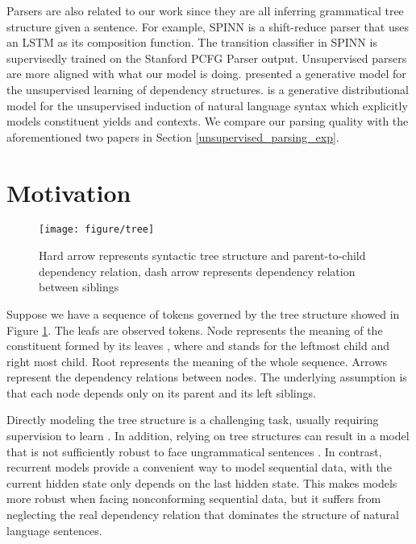 \documentclass{article} \usepackage{iclr2018_conference,times}
\begin{document}
Parsers are also related to our work since they are all inferring grammatical tree structure given a sentence. For example, SPINN \citep{bowman2016fast} is a shift-reduce parser that uses an LSTM as its composition function. The transition classifier in SPINN is supervisedly trained on the Stanford PCFG Parser \citep{Klein:2003:AUP:1075096.1075150} output. Unsupervised parsers are more aligned with what our model is doing. \cite{klein2004corpus} presented a generative model for the unsupervised learning of dependency structures. \cite{klein2002generative} is a generative distributional model for the unsupervised induction of natural language syntax which explicitly models constituent yields and contexts. We compare our parsing quality with the aforementioned two papers in Section \ref{unsupervised_parsing_exp}.















\section{Motivation}
\begin{figure}[h]
  \centering
  \texttt{[image: figure/tree]}
  \caption{Hard arrow represents syntactic tree structure and parent-to-child dependency relation, dash arrow represents dependency relation between siblings}
  \label{fig_tree}
\end{figure}

Suppose we have a sequence of tokens  governed by the tree structure showed in Figure \ref{fig_tree}. The leafs  are observed tokens. Node  represents the meaning of the constituent formed by its leaves , where  and  stands for the leftmost child and right most child. Root  represents the meaning of the whole sequence. Arrows represent the dependency relations between nodes. The underlying assumption is that each node depends only on its parent and its left siblings. 

Directly modeling the tree structure is a challenging task, usually requiring supervision to learn \citep{tai2015improved}. In addition, relying on tree structures can result in a model that is not sufficiently robust to face ungrammatical sentences \citep{hashemi2016evaluation}. 
In contrast, recurrent models provide a convenient way to model sequential data, with the current hidden state only depends on the last hidden state. This makes models more robust when facing nonconforming sequential data, but it suffers from neglecting the real dependency relation that dominates the structure of natural language sentences.
\end{document}
